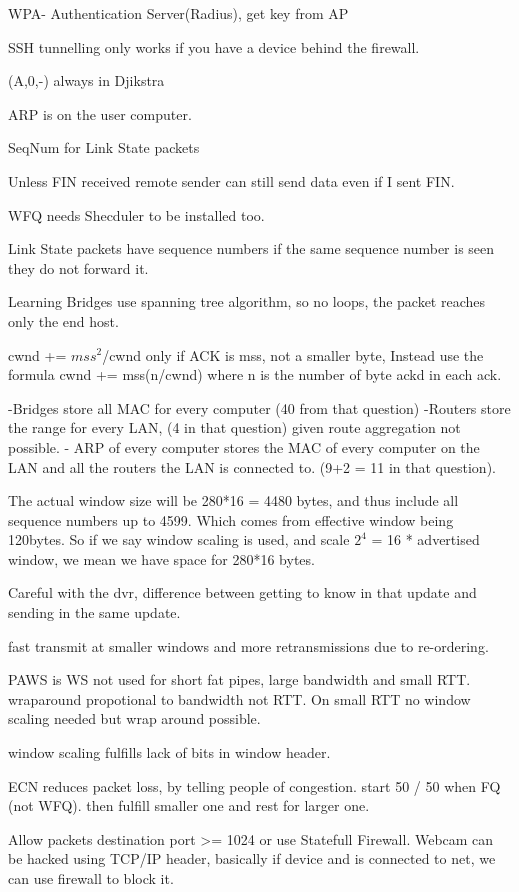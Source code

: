\documentclass[11pt, a4paper]{article}
\begin{document}
WPA- Authentication Server(Radius), get key from AP

SSH tunnelling only works if you have a device behind the firewall.


(A,0,-) always in Djikstra

ARP is on the user computer.

SeqNum for Link State packets

Unless FIN received remote sender can still send data even if I sent FIN.

WFQ needs Shecduler to be installed too.

Link State packets have sequence numbers if the same sequence number is seen they do not forward it.

Learning Bridges use spanning tree algorithm, so no loops, the packet reaches only the end host.

cwnd += $mss^2$/cwnd
only if ACK is mss, not a smaller byte, Instead use the formula 
cwnd += mss(n/cwnd) where n is the number of byte ackd in each ack.

-Bridges store all MAC for every computer (40 from that question)
-Routers store the range for every LAN, (4 in that question) given route aggregation not possible.
- ARP of every computer stores the MAC of every computer on the LAN and all the routers the LAN is connected to. (9+2 = 11 in that question).

The actual window size will be 280*16 = 4480 bytes, and thus include all sequence numbers up to 4599. Which comes from effective window being 120bytes. So if we say window scaling is used, and scale $2^4$ = 16 * advertised window, we mean we have space for 280*16 bytes.

Careful with the dvr, difference between getting to know in that update and sending in the same update.

fast transmit at smaller windows and more retransmissions due to re-ordering.

PAWS is WS not used for short fat pipes, large bandwidth and small RTT. wraparound propotional to bandwidth not RTT. On small RTT no window scaling needed but wrap around possible.

window scaling fulfills lack of bits in window header.

ECN reduces packet loss, by telling people of congestion.
start 50 / 50 when FQ (not WFQ). then fulfill smaller one and rest for larger one.

Allow packets destination port >= 1024 or use Statefull Firewall.
Webcam can be hacked using TCP/IP header, basically if device and is connected to net, we can use firewall to block it.
\end{document}
